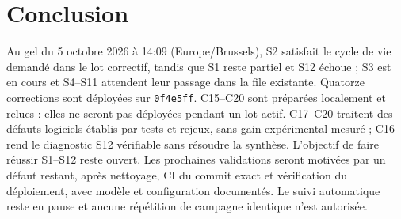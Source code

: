 \documentclass[11pt,a4paper]{article}
\newcommand{\code}[1]{{\urlstyle{tt}\nolinkurl{#1}}}
\begin{document}
\section{Conclusion}
\label{sec:conclusion-corrections}

Au gel du 5 octobre 2026 à 14:09 (Europe/Brussels), S2 satisfait le cycle de vie demandé dans le lot correctif, tandis que S1 reste partiel et S12 échoue ; S3 est en cours et S4--S11 attendent leur passage dans la file existante. Quatorze corrections sont déployées sur \code{0f4e5ff}. C15--C20 sont préparées localement et relues : elles ne seront pas déployées pendant un lot actif. C17--C20 traitent des défauts logiciels établis par tests et rejeux, sans gain expérimental mesuré ; C16 rend le diagnostic S12 vérifiable sans résoudre la synthèse. L'objectif de faire réussir S1--S12 reste ouvert. Les prochaines validations seront motivées par un défaut restant, après nettoyage, CI du commit exact et vérification du déploiement, avec modèle et configuration documentés. Le suivi automatique reste en pause et aucune répétition de campagne identique n'est autorisée.
\end{document}
